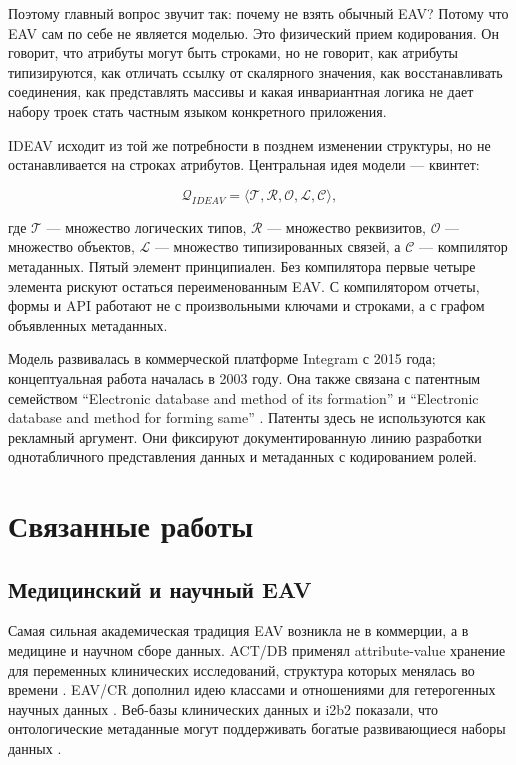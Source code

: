 \documentclass[11pt]{article}
\begin{document}
Поэтому главный вопрос звучит так: почему не взять обычный EAV? Потому что EAV
сам по себе не является моделью. Это физический прием кодирования. Он говорит,
что атрибуты могут быть строками, но не говорит, как атрибуты типизируются, как
отличать ссылку от скалярного значения, как восстанавливать соединения, как
представлять массивы и какая инвариантная логика не дает набору троек стать
частным языком конкретного приложения.

IDEAV исходит из той же потребности в позднем изменении структуры, но не
останавливается на строках атрибутов. Центральная идея модели --- квинтет:

\[
  \mathcal{Q}_{IDEAV} =
  \langle \mathcal{T}, \mathcal{R}, \mathcal{O}, \mathcal{L}, \mathcal{C} \rangle ,
\]

где \(\mathcal{T}\) --- множество логических типов, \(\mathcal{R}\) ---
множество реквизитов, \(\mathcal{O}\) --- множество объектов, \(\mathcal{L}\)
--- множество типизированных связей, а \(\mathcal{C}\) --- компилятор
метаданных. Пятый элемент принципиален. Без компилятора первые четыре элемента
рискуют остаться переименованным EAV. С компилятором отчеты, формы и API
работают не с произвольными ключами и строками, а с графом объявленных
метаданных.

Модель развивалась в коммерческой платформе Integram с 2015 года; концептуальная
работа началась в 2003 году. Она также связана с патентным семейством
``Electronic database and method of its formation'' \citep{semenov2018ru} и
``Electronic database and method for forming same'' \citep{semenov2021us}.
Патенты здесь не используются как рекламный аргумент. Они фиксируют
документированную линию разработки однотабличного представления данных и
метаданных с кодированием ролей.

\section{Связанные работы}

\subsection{Медицинский и научный EAV}

Самая сильная академическая традиция EAV возникла не в коммерции, а в медицине
и научном сборе данных. ACT/DB применял attribute-value хранение для переменных
клинических исследований, структура которых менялась во времени
\citep{nadkarni1998actdb}. EAV/CR дополнил идею классами и отношениями для
гетерогенных научных данных \citep{nadkarni1999eavcr,marenco2003eavcr}.
Веб-базы клинических данных и i2b2 показали, что онтологические метаданные могут
поддерживать богатые развивающиеся наборы данных
\citep{anhoj2003generic,murphy2010i2b2}.
\end{document}
